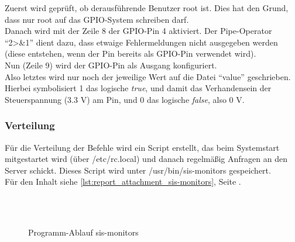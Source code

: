 Zuerst wird geprüft, ob derausführende Benutzer root ist. Dies hat den Grund, dass nur root auf das GPIO-System schreiben darf.\\
Danach wird mit der Zeile 8 der GPIO-Pin 4 aktiviert. Der Pipe-Operator \enquote{2>\&1} dient dazu, dass etwaige Fehlermeldungen nicht ausgegeben werden (diese entstehen, wenn der Pin bereits als GPIO-Pin verwendet wird).\\
Nun (Zeile 9) wird der GPIO-Pin als Ausgang konfiguriert.\\
Also letztes wird nur noch der jeweilige Wert auf die Datei \enquote{value} geschrieben. Hierbei symbolisiert 1 das logische \textit{true}, und damit das Verhandensein der Steuerspannung (3.3 V) am Pin, und 0 das logische \textit{false}, also 0 V.

\subsubsection{Verteilung}

Für die Verteilung der Befehle wird ein Script erstellt, das beim Systemstart mitgestartet wird (über /etc/rc.local) und danach regelmäßig Anfragen an den Server schickt.
Dieses Script wird unter /usr/bin/sis-monitors gespeichert.\\
Für den Inhalt siehe \autoref{lst:report_attachment_sis-monitors}, Seite \pageref{lst:report_attachment_sis-monitors}.\\
\\
\begin{figure}[H]
\centering
{}\\
\caption{Programm-Ablauf sis-monitors}
\end{figure}

